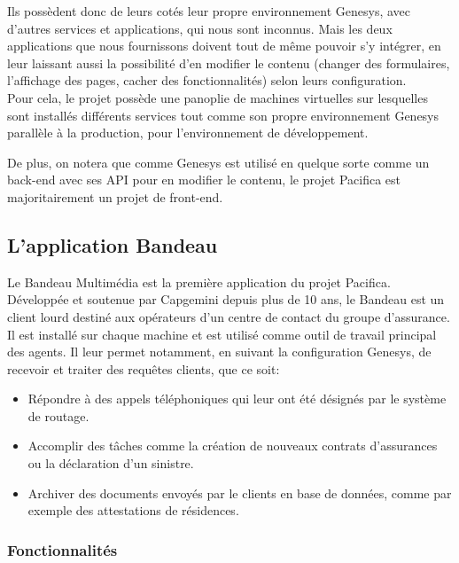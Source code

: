 \documentclass{rapport}
\begin{document}
Ils possèdent donc de leurs cotés leur propre environnement Genesys, avec d'autres services et applications, qui nous sont inconnus. Mais les deux applications que nous fournissons doivent tout de même pouvoir s'y intégrer, en leur laissant aussi la possibilité d'en modifier le contenu (changer des formulaires, l'affichage des pages, cacher des fonctionnalités) selon leurs configuration.\\
Pour cela, le projet possède une panoplie de machines virtuelles sur lesquelles sont installés différents services tout comme son propre environnement Genesys parallèle à la production, pour l'environnement de développement.

De plus, on notera que comme Genesys est utilisé en quelque sorte comme un back-end avec ses API pour en modifier le contenu, le projet Pacifica est majoritairement un projet de front-end.\\

\subsection{L'application Bandeau}

Le Bandeau Multimédia est la première application du projet Pacifica. Développée et soutenue par Capgemini depuis plus de 10 ans, le Bandeau est un client lourd destiné aux opérateurs d'un centre de contact du groupe d'assurance. Il est installé sur chaque machine et est utilisé comme outil de travail principal des agents. Il leur permet notamment, en suivant la configuration Genesys, de recevoir et traiter des requêtes clients, que ce soit:\\

\begin{itemize}
\item Répondre à des appels téléphoniques qui leur ont été désignés par le système de routage.
\item Accomplir des tâches comme la création de nouveaux contrats d'assurances ou la déclaration d'un sinistre.
\item Archiver des documents envoyés par le clients en base de données, comme par exemple des attestations de résidences.
\end{itemize}

\subsubsection{Fonctionnalités}
\end{document}
